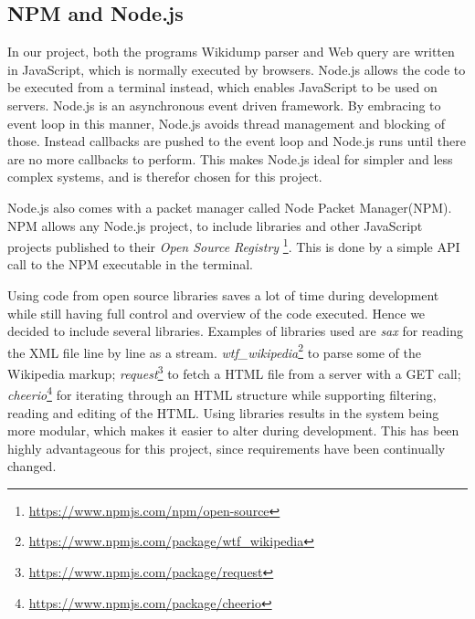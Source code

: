 \subsection{NPM and Node.js}
In our project, both the programs Wikidump parser and Web query are written in JavaScript, which is normally executed by browsers. Node.js\cite{node} allows the code to be executed from a terminal instead, which enables JavaScript to be used on servers.  Node.js is an asynchronous event driven framework. By embracing to event loop in this manner, Node.js avoids thread management and blocking of those. Instead callbacks are pushed to the event loop and Node.js runs until there are no more callbacks to perform. This makes Node.js ideal for simpler and less complex systems, and is therefor chosen for this project.

Node.js also comes with a packet manager called Node Packet Manager(NPM). NPM allows any Node.js project, to include libraries and other JavaScript projects published to their \textit{Open Source Registry} \footnote{\url{https://www.npmjs.com/npm/open-source}}. This is done by a simple API call to the NPM executable in the terminal.

Using code from open source libraries saves a lot of time during development while still having full control and overview of the code executed. Hence we decided to include several libraries. Examples of libraries used are \textit{sax} for reading the XML file line by line as a stream.  \textit{wtf\_wikipedia}\footnote{\url{https://www.npmjs.com/package/wtf_wikipedia}} to parse some of the Wikipedia markup;  \textit{request}\footnote{\url{https://www.npmjs.com/package/request}} to fetch a HTML file from a server with a GET call;  \textit{cheerio}\footnote{\url{https://www.npmjs.com/package/cheerio}} for iterating through an HTML structure while supporting filtering, reading and editing of the HTML. Using libraries results in the system being more modular, which makes it easier to alter during development. This has been highly advantageous for this project, since requirements have been continually changed. 


\cleardoublepage